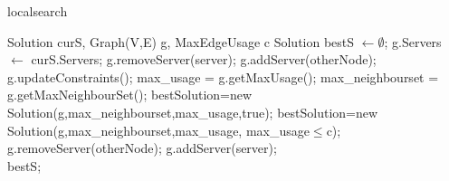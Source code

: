 \documentclass [12pt]{article}
\begin{document}
\begin {algorithm} [H]
\caption {localsearch}
\label {localS}
\begin {algorithmic} [3]
\Require Solution curS, Graph(V,E) g, MaxEdgeUsage c 
\State Solution bestS $\gets \emptyset$;
\State g.Servers $\gets$ curS.Servers;
  \State    g.removeServer(server);
      \State g.addServer(otherNode);
      \State g.updateConstraints();
      \State max\_usage = g.getMaxUsage();
      \State max\_neighbourset = g.getMaxNeighbourSet();
        \State bestSolution=new Solution(g,max\_neighbourset,max\_usage,true);
      \EndIf 
        \State bestSolution=new Solution(g,max\_neighbourset,max\_usage, max\_usage$\leq$c);
        \State g.removeServer(otherNode);
      \EndIf
      \EndIf
   \EndFor
   \State g.addServer(server);
\EndFor\\
    \Return  bestS;
\end {algorithmic}
\end {algorithm}
\end{document}
